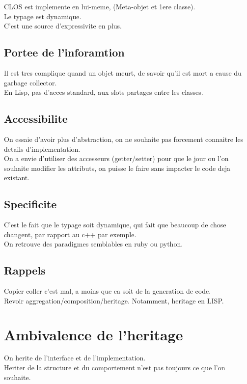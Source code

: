 \documentclass[a4paper,11pt]{article}
\begin{document}
CLOS est implemente en lui-meme, (Meta-objet et 1ere classe).\\
Le typage est dynamique.\\
C'est une source d'expressivite en plus.\\

\subsection{Portee de l'inforamtion}
Il est tres complique quand un objet meurt, de savoir qu'il est mort a cause du garbage collector.\\
En Lisp, pas d'acces standard, aux slots partages entre les classes.

\subsection{Accessibilite}
On essaie d'avoir plus d'abstraction, on ne souhaite pas forcement connaitre les details d'implementation.\\
On a envie d'utiliser des accesseurs (getter/setter) pour que le jour ou l'on souhaite modifier les attributs, on puisse le faire sans impacter le code deja existant.\\
\subsection{Specificite}
C'est le fait que le typage soit dynamique, qui fait que beaucoup de chose changent, par rapport au c++ par exemple.\\
On retrouve des paradigmes semblables en ruby ou python.\\

\subsection{Rappels}
Copier coller c'est mal, a moins que ca soit de la generation de code.\\
Revoir aggregation/composition/heritage. Notamment, heritage en LISP.\\
 
\section{Ambivalence de l'heritage}
On herite de l'interface et de l'implementation.\\
Heriter de la structure et du comportement n'est pas toujours ce que l'on souhaite.\\
\end{document}
